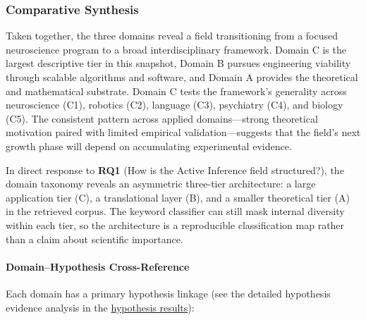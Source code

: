 \documentclass[
  english,
]{article}
\begin{document}
\subsubsection{Comparative Synthesis}\label{comparative-synthesis}

Taken together, the three domains reveal a field transitioning from a
focused neuroscience program to a broad interdisciplinary framework.
Domain C is the largest descriptive tier in this snapshot, Domain B
pursues engineering viability through scalable algorithms and software,
and Domain A provides the theoretical and mathematical substrate. Domain
C tests the framework's generality across neuroscience (C1), robotics
(C2), language (C3), psychiatry (C4), and biology (C5). The consistent
pattern across applied domains---strong theoretical motivation paired
with limited empirical validation---suggests that the field's next
growth phase will depend on accumulating experimental evidence.

In direct response to \textbf{RQ1} (How is the Active Inference field
structured?), the domain taxonomy reveals an asymmetric three-tier
architecture: a large application tier (C), a translational layer (B),
and a smaller theoretical tier (A) in the retrieved corpus. The keyword
classifier can still mask internal diversity within each tier, so the
architecture is a reproducible classification map rather than a claim
about scientific importance.

\paragraph{Domain--Hypothesis
Cross-Reference}\label{domainhypothesis-cross-reference}

Each domain has a primary hypothesis linkage (see the detailed
hypothesis evidence analysis in the
\hyperref[sec:hypothesis_results]{hypothesis results}):
\end{document}
